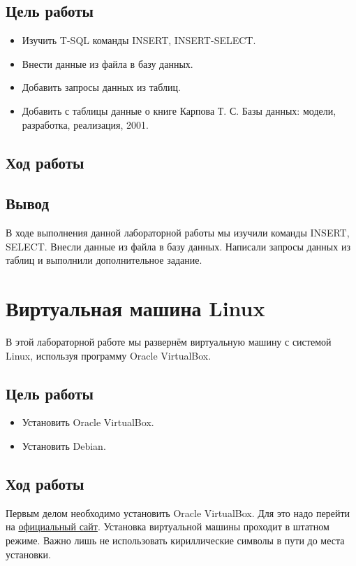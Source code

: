 \subsection{Цель работы}
\begin{itemize}
    \item Изучить T-SQL команды INSERT, INSERT-SELECT.
    \item Внести данные из файла в базу данных.
    \item Добавить запросы данных из таблиц.
    \item Добавить с таблицы данные о книге Карпова Т. С. Базы данных: модели, разработка, реализация, 2001.
\end{itemize}
\subsection{Ход работы}

\subsection{Вывод}
В ходе выполнения данной лабораторной работы мы изучили команды INSERT, SELECT. Внесли данные из файла в базу данных. Написали запросы данных из таблиц и выполнили дополнительное задание. 

\section{Виртуальная машина Linux}
В этой лабораторной работе мы развернём виртуальную машину с системой Linux, используя программу Oracle VirtualBox. 

\subsection{Цель работы}
\begin{itemize}
    \item Установить Oracle VirtualBox.
    \item Установить Debian.
\end{itemize}
\subsection{Ход работы}

Первым делом необходимо установить Oracle VirtualBox. Для это надо перейти на \href{https://www.virtualbox.org/}{официальный сайт}. Установка виртуальной машины проходит в штатном режиме. Важно лишь не использовать кириллические символы в пути до места установки.

